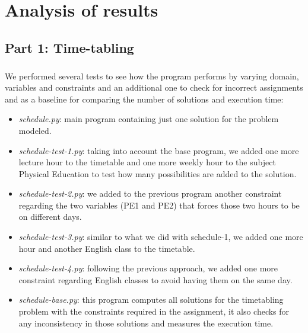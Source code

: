 \chapter{Analysis of results}
\label{chapter: analysis of results}


\section{Part 1: Time-tabling}
\paragraph{}
We performed several tests to see how the program performs by varying domain, variables and constraints and an additional one to check for incorrect assignments and as a baseline for comparing the number of solutions and execution time:

\begin{itemize}
    \item[] \textit{schedule.py}: main program containing just one solution for the problem modeled.
    
    \item[] \textit{schedule-test-1.py}: taking into account the base program, we added one more lecture hour to the timetable and one more weekly hour to the subject Physical Education to test how many possibilities are added to the solution.
    
    \item[] \textit{schedule-test-2.py}: we added to the previous program another constraint regarding the two variables (PE1 and PE2) that forces those two hours to be on different days.
    
    \item[] \textit{schedule-test-3.py}: similar to what we did with schedule-1, we added one more hour and another English class to the timetable.
    
    \item[] \textit{schedule-test-4.py}: following the previous approach, we added one more constraint regarding English classes to avoid having them on the same day.
    
    \item[] \textit{schedule-base.py}: this program computes all solutions for the timetabling problem with the constraints required in the assignment, it also checks for any inconsistency in those solutions and measures the execution time.
    
\end{itemize}

